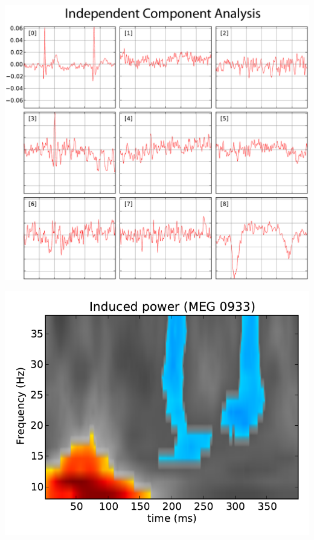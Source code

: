 \documentclass[t,11pt,compress]{beamer} %
\newcommand{\vfillll}{\vfilll\vfilll\vfilll\vfilll\vfilll\vfilll\vfilll\vfilll\vfilll\vfilll\vfilll\vfilll\vfilll\vfilll\vfilll\vfilll\vfilll\vfilll\vfilll\vfilll\vfilll\vfilll\vfilll\vfilll\vfilll\vfilll\vfilll\vfilll\vfilll\vfilll\vfilll\vfilll\vfilll\vfilll\vfilll\vfilll\vfilll\vfilll\vfilll\vfilll}
\begin{document}
\begin{frame}[plain,t,c]
\vfillll


\vfillll

\vspace*{-0.5em}%


\begin{minipage}{1.09\linewidth}

\begin{minipage}{.19\linewidth}
    \includegraphics[width=\linewidth]{ica.pdf}%
\end{minipage}%
\begin{minipage}{.23\linewidth}
    \includegraphics[width=\linewidth]{stats_cluster_tfr.pdf}

\end{minipage}
\end{minipage}
\end{frame}
\end{document}

